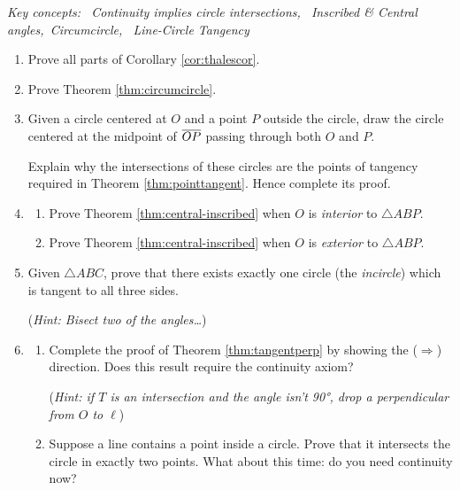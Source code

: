 \begin{exercises}
	\hangindent\leftmargini\emph{Key concepts: \ Continuity implies circle intersections, \ Inscribed \& Central angles,\ Circumcircle, \ Line-Circle Tangency}

	\begin{enumerate}
	  \item Prove all parts of Corollary \ref{cor:thalescor}.
	  
	  
	  \item Prove Theorem \ref{thm:circumcircle}.
	  
	  
	  \item\label{ex:pointtangent} Given a circle centered at $O$ and a point $P$ outside the circle, draw the circle centered at the midpoint of $\overline{OP}$ passing through both $O$ and $P$.\par
	  Explain why the intersections of these circles are the points of tangency required in Theorem \ref{thm:pointtangent}. Hence complete its proof.
	  
	  
	  \item\begin{enumerate}
	    \item Prove Theorem \ref{thm:central-inscribed} when $O$ is \emph{interior} to $\triangle ABP$.
	    \item Prove Theorem \ref{thm:central-inscribed} when $O$ is \emph{exterior} to $\triangle ABP$.
	  \end{enumerate}
	  
	  
	  \item Given  $\triangle ABC$, prove that there exists exactly one circle (the \emph{incircle}) which is tangent to all three sides.\par
	  (\emph{Hint: Bisect two of the angles\ldots})
	  
	  
	  \pagebreak[3]
	  
	  
	  \item\begin{enumerate}
	    \item Complete the proof of Theorem \ref{thm:tangentperp} by showing the ($\Rightarrow$) direction. Does this result require the continuity axiom?\par
	 		(\emph{Hint: if $T$ is an intersection and the angle isn't \ang{90}, drop a perpendicular from $O$ to $\ell$})
	 		
	 		\item Suppose a line contains a point inside a circle. Prove that it intersects the circle in exactly two points. What about this time: do you need continuity now? %
	  \end{enumerate}
	  

\end{enumerate}
\end{exercises}
